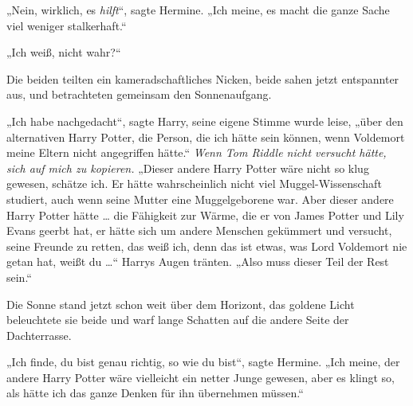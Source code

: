 „Nein, wirklich, es \emph{hilft}“, sagte Hermine.
„Ich meine, es macht die ganze Sache viel weniger stalkerhaft.“

„Ich weiß, nicht wahr?“

Die beiden teilten ein kameradschaftliches Nicken, beide sahen jetzt entspannter aus, und betrachteten gemeinsam den Sonnenaufgang.

„Ich habe nachgedacht“, sagte Harry, seine eigene Stimme wurde leise, „über den alternativen Harry Potter, die Person, die ich hätte sein können, wenn Voldemort meine Eltern nicht angegriffen hätte.“
\emph{Wenn Tom Riddle nicht versucht hätte, sich auf mich zu kopieren.}
„Dieser andere Harry Potter wäre nicht so klug gewesen, schätze ich. Er hätte wahrscheinlich nicht viel Muggel-Wissenschaft studiert, auch wenn seine Mutter eine Muggelgeborene war. Aber dieser andere Harry Potter hätte … die Fähigkeit zur Wärme, die er von James Potter und Lily Evans geerbt hat, er hätte sich um andere Menschen gekümmert und versucht, seine Freunde zu retten, das weiß ich, denn das ist etwas, was Lord Voldemort nie getan hat, weißt du …“
Harrys Augen tränten.
„Also muss dieser Teil der Rest sein.“

Die Sonne stand jetzt schon weit über dem Horizont, das goldene Licht beleuchtete sie beide und warf lange Schatten auf die andere Seite der Dachterrasse.

„Ich finde, du bist genau richtig, so wie du bist“, sagte Hermine.
„Ich meine, der andere Harry Potter wäre vielleicht ein netter Junge gewesen, aber es klingt so, als hätte ich das ganze Denken für ihn übernehmen müssen.“

